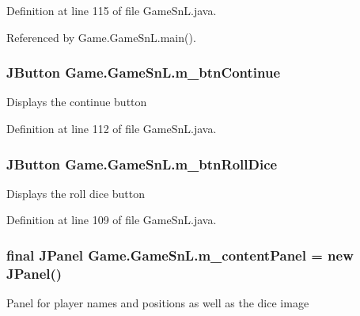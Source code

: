 Definition at line 115 of file Game\+Sn\+L.\+java.



Referenced by Game.\+Game\+Sn\+L.\+main().

\hypertarget{class_game_1_1_game_sn_l_a6e2e15971627fbc196ed207742a79e44}{}
\subsubsection[{m\+\_\+btn\+Continue}]{\setlength{\rightskip}{0pt plus 5cm}J\+Button Game.\+Game\+Sn\+L.\+m\+\_\+btn\+Continue\hspace{0.3cm}{\ttfamily [private]}}\label{class_game_1_1_game_sn_l_a6e2e15971627fbc196ed207742a79e44}
Displays the continue button 

Definition at line 112 of file Game\+Sn\+L.\+java.

\hypertarget{class_game_1_1_game_sn_l_acc91a4663c2f1c4ee9381a070332d7a2}{}
\subsubsection[{m\+\_\+btn\+Roll\+Dice}]{\setlength{\rightskip}{0pt plus 5cm}J\+Button Game.\+Game\+Sn\+L.\+m\+\_\+btn\+Roll\+Dice\hspace{0.3cm}{\ttfamily [private]}}\label{class_game_1_1_game_sn_l_acc91a4663c2f1c4ee9381a070332d7a2}
Displays the roll dice button 

Definition at line 109 of file Game\+Sn\+L.\+java.

\hypertarget{class_game_1_1_game_sn_l_a073ab891cd1c2854f4dd4081cfc1319c}{}
\subsubsection[{m\+\_\+content\+Panel}]{\setlength{\rightskip}{0pt plus 5cm}final J\+Panel Game.\+Game\+Sn\+L.\+m\+\_\+content\+Panel = new J\+Panel()\hspace{0.3cm}{\ttfamily [private]}}\label{class_game_1_1_game_sn_l_a073ab891cd1c2854f4dd4081cfc1319c}
Panel for player names and positions as well as the dice image 

